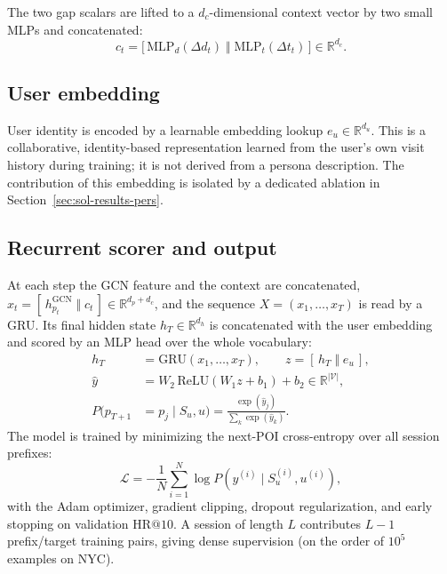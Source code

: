The two gap scalars are lifted to a $d_c$-dimensional context vector by two small MLPs and
concatenated:
\begin{equation}
  c_t = \big[\,\mathrm{MLP}_d(\Delta d_t)\;\Vert\;\mathrm{MLP}_t(\Delta t_t)\,\big]
        \in\mathbb{R}^{d_c}.
  \label{eq:context}
\end{equation}

\subsection{User embedding}
\label{sec:sol-model-user}

User identity is encoded by a learnable embedding lookup $e_u\in\mathbb{R}^{d_u}$. This is a
collaborative, identity-based representation learned from the user's own visit history during
training; it is not derived from a persona description. The contribution of this embedding is
isolated by a dedicated ablation in Section~\ref{sec:sol-results-pers}.

\subsection{Recurrent scorer and output}
\label{sec:sol-model-gru}

At each step the GCN feature and the context are concatenated,
$x_t=[\,h_{p_t}^{\mathrm{GCN}}\;\Vert\;c_t\,]\in\mathbb{R}^{d_p+d_c}$, and the sequence
$X=(x_1,\dots,x_T)$ is read by a GRU. Its final hidden state $h_T\in\mathbb{R}^{d_h}$ is
concatenated with the user embedding and scored by an MLP head over the whole vocabulary:
\begin{align}
  h_T &= \mathrm{GRU}(x_1,\dots,x_T), \qquad z = [\,h_T\;\Vert\;e_u\,], \label{eq:gru}\\
  \hat{y} &= W_2\,\mathrm{ReLU}(W_1 z + b_1) + b_2 \in \mathbb{R}^{|\mathcal{V}|}, \label{eq:head}\\
  P(p_{T+1}&=p_j\mid S_u,u) = \frac{\exp(\hat{y}_j)}{\sum_k \exp(\hat{y}_k)}.
\end{align}
The model is trained by minimizing the next-POI cross-entropy over all session prefixes:
\begin{equation}
  \mathcal{L} = -\frac{1}{N}\sum_{i=1}^{N}\log P\!\left(y^{(i)}\mid S_u^{(i)},u^{(i)}\right),
  \label{eq:loss}
\end{equation}
with the Adam optimizer, gradient clipping, dropout regularization, and early stopping on
validation $\mathrm{HR@}10$. A session of length $L$ contributes $L-1$ prefix/target training
pairs, giving dense supervision (on the order of $10^5$ examples on NYC).

